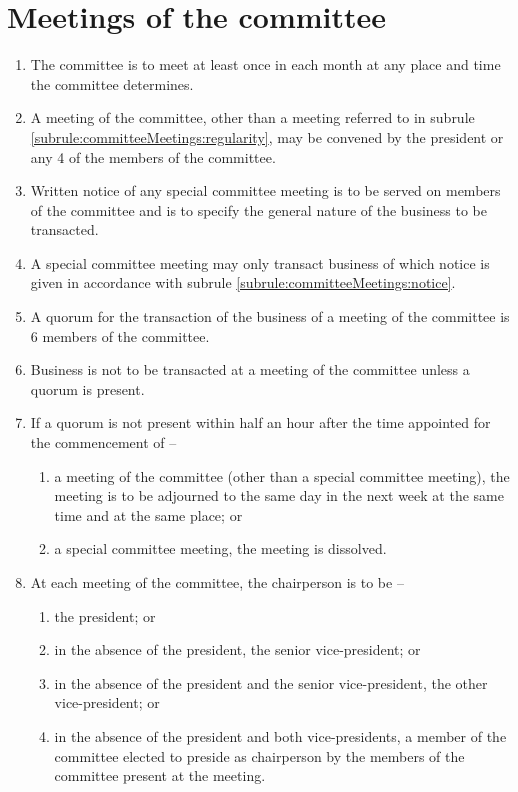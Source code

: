 \section{Meetings of the committee}
\label{rule:committeeMeetings}

\begin{enumerate}
	\item \label{subrule:committeeMeetings:regularity} The committee is to meet at least once in each month at any place and time the committee determines.
	\item A meeting of the committee, other than a meeting referred to in subrule \ref{subrule:committeeMeetings:regularity}, may be convened by the president or any 4 of the members of the committee.
	\item \label{subrule:committeeMeetings:notice} Written notice of any special committee meeting is to be served on members of the committee and is to specify the general nature of the business to be transacted.
	\item A special committee meeting may only transact business of which notice is given in accordance with subrule \ref{subrule:committeeMeetings:notice}.
	\item A quorum for the transaction of the business of a meeting of the committee is 6 members of the committee.
	\item Business is not to be transacted at a meeting of the committee unless a quorum is present.
	
	\item If a quorum is not present within half an hour after the time appointed for the commencement of --
	\begin{enumerate}
		\item a meeting of the committee (other than a special committee meeting), the meeting is to be adjourned to the same day in the next week at the same time and at the same place; or
		\item a special committee meeting, the meeting is dissolved.
	\end{enumerate}
	
	\item At each meeting of the committee, the chairperson is to be --
	\begin{enumerate}
		\item the president; or
		\item in the absence of the president, the senior vice-president; or
		\item in the absence of the president and the senior vice-president, the other vice-president; or
		\item in the absence of the president and both vice-presidents, a member of the committee elected to preside as chairperson by the members of the committee present at the meeting.
	\end{enumerate}
	

\end{enumerate}
